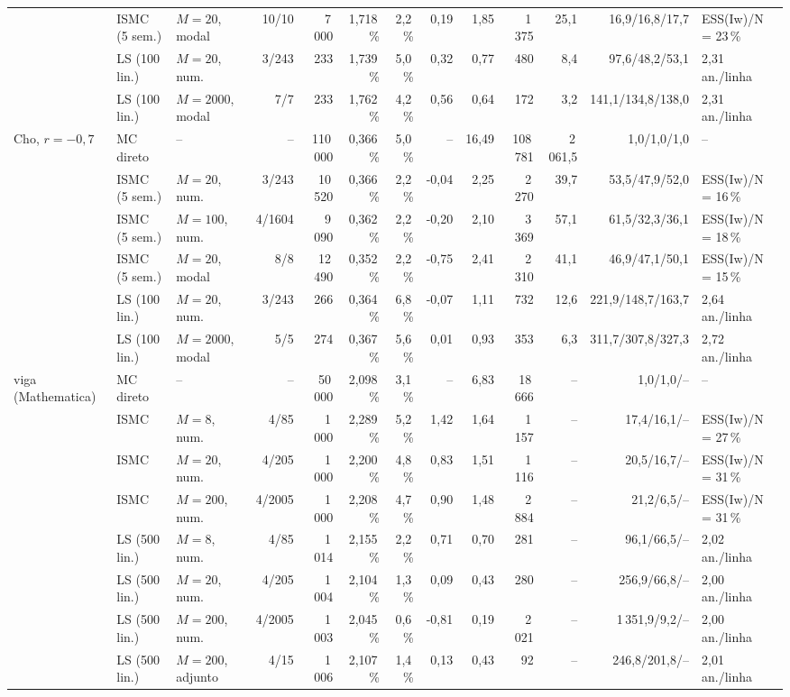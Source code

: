 \begin{landscape}
\begin{table}[p]
\begin{tabular}{lllrrrrrrrrrl}
 & ISMC (5 sem.) & $M = 20$, modal & 10/10 & 7\,000 & 1,718\,\% & 2,2\,\% & 0,19 & 1,85 & 1\,375 & 25,1 & 16,9/16,8/17,7 & ESS(Iw)/N = 23\,\% \\
 & LS (100 lin.) & $M = 20$, num. & 3/243 & 233 & 1,739\,\% & 5,0\,\% & 0,32 & 0,77 & 480 & 8,4 & 97,6/48,2/53,1 & 2,31 an./linha \\
 & LS (100 lin.) & $M = 2000$, modal & 7/7 & 233 & 1,762\,\% & 4,2\,\% & 0,56 & 0,64 & 172 & 3,2 & 141,1/134,8/138,0 & 2,31 an./linha \\
\midrule
Cho, $r = -0{,}7$ & MC direto & -- & -- & 110\,000 & 0,366\,\% & 5,0\,\% & -- & 16,49 & 108\,781 & 2\,061,5 & 1,0/1,0/1,0 & -- \\
 & ISMC (5 sem.) & $M = 20$, num. & 3/243 & 10\,520 & 0,366\,\% & 2,2\,\% & -0,04 & 2,25 & 2\,270 & 39,7 & 53,5/47,9/52,0 & ESS(Iw)/N = 16\,\% \\
 & ISMC (5 sem.) & $M = 100$, num. & 4/1604 & 9\,090 & 0,362\,\% & 2,2\,\% & -0,20 & 2,10 & 3\,369 & 57,1 & 61,5/32,3/36,1 & ESS(Iw)/N = 18\,\% \\
 & ISMC (5 sem.) & $M = 20$, modal & 8/8 & 12\,490 & 0,352\,\% & 2,2\,\% & -0,75 & 2,41 & 2\,310 & 41,1 & 46,9/47,1/50,1 & ESS(Iw)/N = 15\,\% \\
 & LS (100 lin.) & $M = 20$, num. & 3/243 & 266 & 0,364\,\% & 6,8\,\% & -0,07 & 1,11 & 732 & 12,6 & 221,9/148,7/163,7 & 2,64 an./linha \\
 & LS (100 lin.) & $M = 2000$, modal & 5/5 & 274 & 0,367\,\% & 5,6\,\% & 0,01 & 0,93 & 353 & 6,3 & 311,7/307,8/327,3 & 2,72 an./linha \\
\midrule
viga (Mathematica) & MC direto & -- & -- & 50\,000 & 2,098\,\% & 3,1\,\% & -- & 6,83 & 18\,666 & -- & 1,0/1,0/-- & -- \\
 & ISMC & $M = 8$, num. & 4/85 & 1\,000 & 2,289\,\% & 5,2\,\% & 1,42 & 1,64 & 1\,157 & -- & 17,4/16,1/-- & ESS(Iw)/N = 27\,\% \\
 & ISMC & $M = 20$, num. & 4/205 & 1\,000 & 2,200\,\% & 4,8\,\% & 0,83 & 1,51 & 1\,116 & -- & 20,5/16,7/-- & ESS(Iw)/N = 31\,\% \\
 & ISMC & $M = 200$, num. & 4/2005 & 1\,000 & 2,208\,\% & 4,7\,\% & 0,90 & 1,48 & 2\,884 & -- & 21,2/6,5/-- & ESS(Iw)/N = 31\,\% \\
 & LS (500 lin.) & $M = 8$, num. & 4/85 & 1\,014 & 2,155\,\% & 2,2\,\% & 0,71 & 0,70 & 281 & -- & 96,1/66,5/-- & 2,02 an./linha \\
 & LS (500 lin.) & $M = 20$, num. & 4/205 & 1\,004 & 2,104\,\% & 1,3\,\% & 0,09 & 0,43 & 280 & -- & 256,9/66,8/-- & 2,00 an./linha \\
 & LS (500 lin.) & $M = 200$, num. & 4/2005 & 1\,003 & 2,045\,\% & 0,6\,\% & -0,81 & 0,19 & 2\,021 & -- & 1\,351,9/9,2/-- & 2,00 an./linha \\
 & LS (500 lin.) & $M = 200$, adjunto & 4/15 & 1\,006 & 2,107\,\% & 1,4\,\% & 0,13 & 0,43 & 92 & -- & 246,8/201,8/-- & 2,01 an./linha \\
\bottomrule\end{tabular}\end{table}
\end{landscape}
